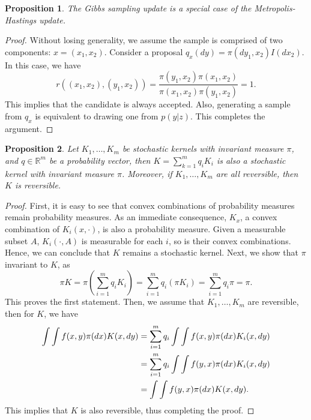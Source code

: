 \documentclass[a4paper,11pt]{article}
\newtheorem{proposition}{Proposition}
\newcommand{\rsp}{\mathbb{R}}
\begin{document}
\begin{proposition}
    The Gibbs sampling update is a special case of the Metropolis-Hastings update.
\end{proposition}


\begin{proof}
    Without losing generality, we assume the sample is comprised of two components: $x = (x_1, x_2)$. Consider a proposal $q_x(dy) = \pi(dy_1, x_2) I(dx_2) $. In this case, we have
    \begin{equation}
        r((x_1, x_2), (y_1, x_2)) = \frac{\pi(y_1, x_2) \pi(x_1, x_2)}{\pi(x_1, x_2) \pi(y_1, x_2)} = 1.
    \end{equation}
    This implies that the candidate is always accepted. Also, generating a sample from $q_x$ is equivalent to drawing one from $p(y|z)$. This completes the argument.
\end{proof}

\begin{proposition}
    Let $K_1, \ldots, K_m$ be stochastic kernels with invariant measure $\pi$, and $q \in \rsp^m$ be a probability vector, then $K = \sum_{k=1}^m q_i K_i$ is also a stochastic kernel with invariant measure $\pi$. Moreover, if $K_1, \ldots, K_m$ are all reversible, then $K$ is reversible. 
\end{proposition}

\begin{proof}
    First, it is easy to see that convex combinations of probability measures remain probability measures. As an immediate consequence, $K_x$, a convex combination of $K_i(x, \cdot)$, is also a probability measure. Given a measurable subset $A$, $K_i(\cdot, A)$ is measurable for each $i$, so is their convex combinations. Hence, we can conclude that $K$ remains a stochastic kernel. Next, we show that $\pi$ invariant to $K$, as
    \begin{equation}
        \pi K = \pi \left(\sum_{i=1}^m q_i K_i\right) = \sum_{i=1}^m q_i (\pi K_i) = \sum_{i=1}^m q_i \pi = \pi.
    \end{equation}
    This proves the first statement. Then, we assume that $K_1, \ldots, K_m$ are reversible, then for $K$, we have
    \begin{align}
        \int \int f(x, y) \pi(dx) K(x, dy) 
        &= \sum_{i=1}^m q_i \int \int f(x, y) \pi(dx) K_i(x, dy) \notag \\
        &= \sum_{i=1}^m q_i \int \int f(y, x) \pi(dx) K_i(x, dy) \notag \\
        &= \int \int f(y, x) \pi(dx) K(x, dy).
    \end{align}
    This implies that $K$ is also reversible, thus completing the proof.
\end{proof}
\end{document}
